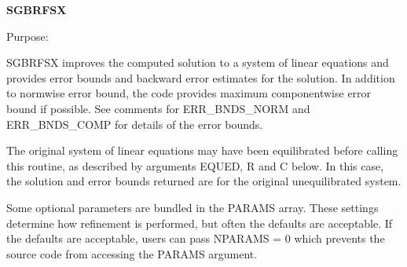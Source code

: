 {\bfseries S\+G\+B\+R\+F\+S\+X} 

 \begin{DoxyParagraph}{Purpose\+: }
\begin{DoxyVerb}    SGBRFSX improves the computed solution to a system of linear
    equations and provides error bounds and backward error estimates
    for the solution.  In addition to normwise error bound, the code
    provides maximum componentwise error bound if possible.  See
    comments for ERR_BNDS_NORM and ERR_BNDS_COMP for details of the
    error bounds.

    The original system of linear equations may have been equilibrated
    before calling this routine, as described by arguments EQUED, R
    and C below. In this case, the solution and error bounds returned
    are for the original unequilibrated system.\end{DoxyVerb}
 \begin{DoxyVerb}     Some optional parameters are bundled in the PARAMS array.  These
     settings determine how refinement is performed, but often the
     defaults are acceptable.  If the defaults are acceptable, users
     can pass NPARAMS = 0 which prevents the source code from accessing
     the PARAMS argument.\end{DoxyVerb}

\end{DoxyParagraph}

